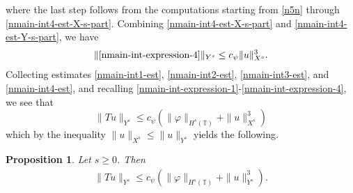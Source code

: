 \documentclass[12pt,reqno]{amsart}
\numberwithin{equation}{section}  %
\newcommand{\ci}{\mathbb{T}}
\newcommand{\vp}{\varphi}
\newtheorem{proposition}[theorem]{Proposition}
\begin{document}
%
%
where the last step follows from the computations starting from \eqref{n5n}
through \eqref{nmain-int4-est-X-s-part}.
Combining \eqref{nmain-int4-est-X-s-part} and \eqref{nmain-int4-est-Y-s-part}, we
have
%
%
\begin{equation}
\label{nmain-int4-est}
	\begin{split}
    \|\eqref{nmain-int-expression-4}\|_{Y^s} \le c_{\psi} \|u\|_{X^s}^{3}.
	\end{split}
\end{equation}
%
%
Collecting estimates \eqref{nmain-int1-est}, \eqref{nmain-int2-est}, 
\eqref{nmain-int3-est}, and \eqref{nmain-int4-est}, and recalling 
\eqref{nmain-int-expression-1}-\eqref{nmain-int-expression-4}, we see that
$$\|Tu\|_{Y^s} \le c_{\psi} \left( \|\vp \|_{H^s(\ci)} + \|u\|_{X^s}^3 \right )$$ 
which by the inequality $\|u\|_{X^s} \le \|u\|_{Y^s}$ yields the following.
%
%				 
%
\begin{proposition}
\label{nprop:contraction}
	Let $s \ge0$. Then
%
\begin{equation*}
	\begin{split}
		\|Tu\|_{Y^s} \le c_{\psi} \left( \|\vp \|_{H^s(\ci)} + \|u\|_{Y^s}^3 
		\right).
	\end{split}
\end{equation*}
%
\end{proposition}
%
%
\end{document}
